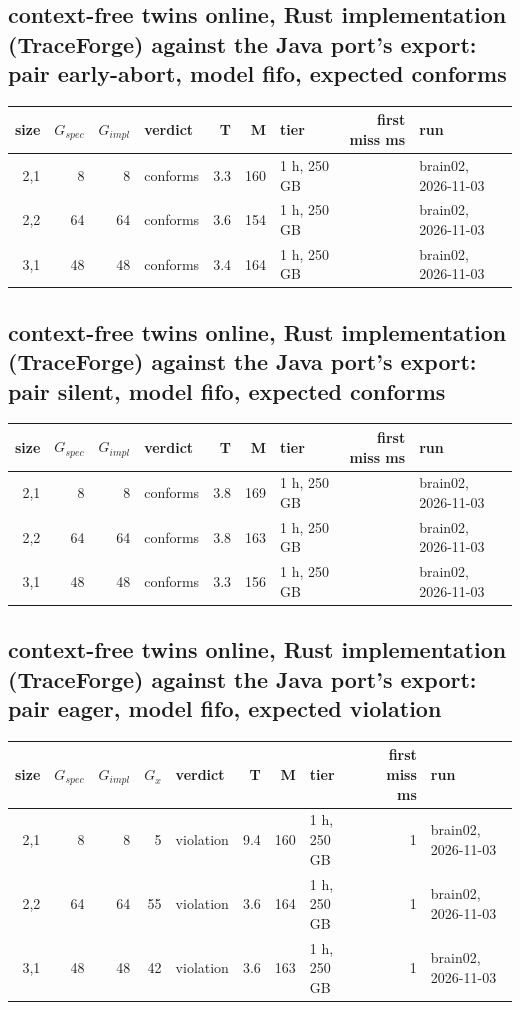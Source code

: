 \documentclass[10pt]{article}
\begin{document}
\subsection*{context-free twins online, Rust implementation (TraceForge) against the Java port's export: pair \textsf{early-abort}, model fifo, expected conforms}
\begin{longtable}{@{}rrrlrrlrl@{}}
\toprule
size & $G_{\mathit{spec}}$ & $G_{\mathit{impl}}$ & verdict & T & M & tier & first miss ms & run \\
\midrule
\endhead
\color{red} 2,1 & 8 & 8 & conforms & 3.3 & 160 & 1 h, 250 GB &  & brain02, 2026-11-03 \\
\color{red} 2,2 & 64 & 64 & conforms & 3.6 & 154 & 1 h, 250 GB &  & brain02, 2026-11-03 \\
\color{red} 3,1 & 48 & 48 & conforms & 3.4 & 164 & 1 h, 250 GB &  & brain02, 2026-11-03 \\
\bottomrule
\end{longtable}
\subsection*{context-free twins online, Rust implementation (TraceForge) against the Java port's export: pair \textsf{silent}, model fifo, expected conforms}
\begin{longtable}{@{}rrrlrrlrl@{}}
\toprule
size & $G_{\mathit{spec}}$ & $G_{\mathit{impl}}$ & verdict & T & M & tier & first miss ms & run \\
\midrule
\endhead
\color{red} 2,1 & 8 & 8 & conforms & 3.8 & 169 & 1 h, 250 GB &  & brain02, 2026-11-03 \\
\color{red} 2,2 & 64 & 64 & conforms & 3.8 & 163 & 1 h, 250 GB &  & brain02, 2026-11-03 \\
\color{red} 3,1 & 48 & 48 & conforms & 3.3 & 156 & 1 h, 250 GB &  & brain02, 2026-11-03 \\
\bottomrule
\end{longtable}
\subsection*{context-free twins online, Rust implementation (TraceForge) against the Java port's export: pair \textsf{eager}, model fifo, expected violation}
\begin{longtable}{@{}rrrrlrrlrl@{}}
\toprule
size & $G_{\mathit{spec}}$ & $G_{\mathit{impl}}$ & $G_x$ & verdict & T & M & tier & first miss ms & run \\
\midrule
\endhead
\color{red} 2,1 & 8 & 8 & 5 & violation & 9.4 & 160 & 1 h, 250 GB & 1 & brain02, 2026-11-03 \\
\color{red} 2,2 & 64 & 64 & 55 & violation & 3.6 & 164 & 1 h, 250 GB & 1 & brain02, 2026-11-03 \\
\color{red} 3,1 & 48 & 48 & 42 & violation & 3.6 & 163 & 1 h, 250 GB & 1 & brain02, 2026-11-03 \\
\bottomrule
\end{longtable}
\end{document}
